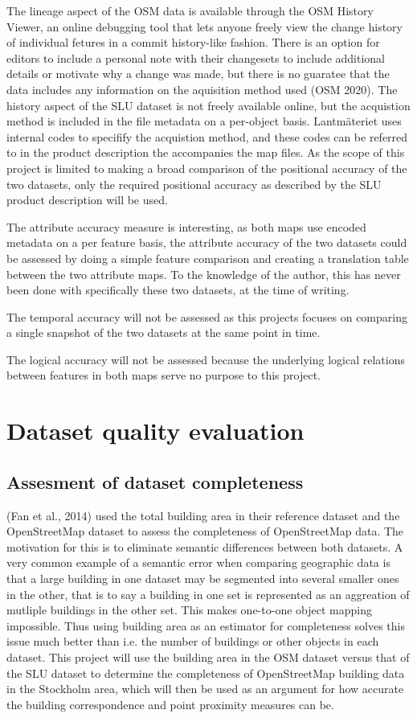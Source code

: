 \documentclass[a4paper]{article}
\begin{document}
The lineage aspect of the OSM data is available through the OSM History Viewer, an online debugging tool that lets anyone freely view the change history of individual fetures in a commit history-like fashion. There is an option for editors to include a personal note with their changesets to include additional details or motivate why a change was made, but there is no guaratee that the data includes any information on the aquisition method used (OSM 2020). The history aspect of the SLU dataset is not freely available online, but the acquistion method is included in the file metadata on a per-object basis. Lantmäteriet uses internal codes to specifify the acquistion method, and these codes can be referred to in the product description the accompanies the map files. As the scope of this project is limited to making a broad comparison of the positional accuracy of the two datasets, only the required positional accuracy as described by the SLU product description will be used.

The attribute accuracy measure is interesting, as both maps use encoded metadata on a per feature basis, the attribute accuracy of the two datasets could be assessed by doing a simple feature comparison and creating a translation table between the two attribute maps. To the knowledge of the author, this has never been done with specifically these two datasets, at the time of writing.

The temporal accuracy will not be assessed as this projects focuses on comparing a single snapshot of the two datasets at the same point in time.

The logical accuracy will not be assessed because the underlying logical relations between features in both maps serve no purpose to this project.

\section{Dataset quality evaluation}

\subsection{Assesment of dataset completeness}

(Fan et al., 2014) used the total building area in their reference dataset and the OpenStreetMap dataset to assess the completeness of OpenStreetMap data. The motivation for this is to eliminate semantic differences between both datasets. A very common example of a semantic error when comparing geographic data is that a large building in one dataset may be segmented into several smaller ones in the other, that is to say a building in one set is represented as an aggreation of mutliple buildings in the other set. This makes one-to-one object mapping impossible. Thus using building area as an estimator for completeness solves this issue much better than i.e. the number of buildings or other objects in each dataset.
This project will use the building area in the OSM dataset versus that of the SLU dataset to determine the completeness of OpenStreetMap building data in the Stockholm area, which will then be used as an argument for how accurate the building correspondence and point proximity measures can be.
\end{document}
